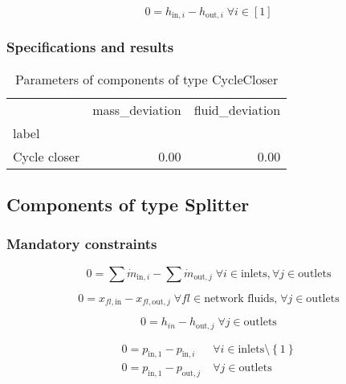 \documentclass[]{article}
\begin{document}
\begin{equation}
\label{eq:CycleCloser_enthalpy_equality_constraints}
0=h_{\mathrm{in,}i}-h_{\mathrm{out,}i}\; \forall i \in [1]
\end{equation}


\subsubsection{Specifications and results}

\begin{table}[H]
\centering
\caption{Parameters of components of type CycleCloser}
\begin{tabular}{lrr}
\toprule
{} & mass\_deviation & fluid\_deviation \\
label        &                 &                  \\
\midrule
Cycle closer &            0.00 &             0.00 \\
\bottomrule
\end{tabular}
\end{table}
\subsection{Components of type Splitter}

\subsubsection{Mandatory constraints}

\begin{equation}
\label{eq:Splitter_mass_flow_constraints}
0 =\sum\dot{m}_{\mathrm{in},i}-\sum\dot{m}_{\mathrm{out},j}\;\forall i \in \text{inlets}, \forall j \in \text{outlets}
\end{equation}

\begin{equation}
\label{eq:Splitter_fluid_constraints}
0 = x_{fl\mathrm{,in}} - x_{fl\mathrm{,out,}j}\; \forall fl \in \text{network fluids,} \; \forall j \in\text{outlets}
\end{equation}

\begin{equation}
\label{eq:Splitter_energy_balance_constraints}
0=h_{in}-h_{\mathrm{out,}j}\;\forall j \in\text{outlets}
\end{equation}

\begin{equation}
\label{eq:Splitter_pressure_constraints}
\begin{split}
0 = p_\mathrm{in,1} - p_{\mathrm{in,}i} & \; \forall i \in \text{inlets} \setminus \left\lbrace 1\right\rbrace\\
0 = p_\mathrm{in,1} - p_{\mathrm{out,}j} & \; \forall j \in \text{outlets}\\
\end{split}
\end{equation}
\end{document}
